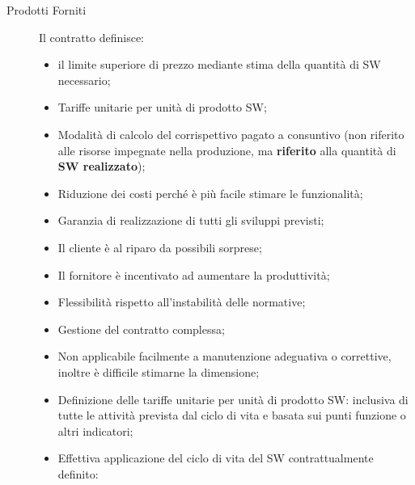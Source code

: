 \documentclass{article}
\begin{document}
\begin{description}
    \item[Prodotti Forniti] Il contratto definisce:
        \begin{itemize}
            \item il limite superiore di prezzo mediante stima della quantità di SW necessario;
            \item Tariffe unitarie per unità di prodotto SW;
            \item Modalità di calcolo del corrispettivo pagato a consuntivo (non riferito alle risorse impegnate nella produzione, ma \textbf{riferito} alla quantità di \textbf{SW realizzato});
        \end{itemize}
        \begin{note}[Vantaggi]
            \begin{itemize}
                \item Riduzione dei costi perché è più facile stimare le funzionalità;
                \item Garanzia di realizzazione di tutti gli sviluppi previsti;
                \item Il cliente è al riparo da possibili sorprese;
                \item Il fornitore è incentivato ad aumentare la produttività;
                \item Flessibilità rispetto all'instabilità delle normative;
            \end{itemize}
        \end{note}
        \begin{warning}[Svantaggi]
            \begin{itemize}
                \item Gestione del contratto complessa;
                \item Non applicabile facilmente a manutenzione adeguativa o correttive, inoltre è difficile stimarne la dimensione;
            \end{itemize}
        \end{warning}
        \begin{critical}[Criticità]
            \begin{itemize}
                \item Definizione delle tariffe unitarie per unità di prodotto SW: inclusiva di tutte le attività prevista dal ciclo di vita e basata sui punti funzione o altri indicatori;
                \item Effettiva applicazione del ciclo di vita del SW contrattualmente definito:

\end{itemize}
\end{critical}
\end{description}
\end{document}
